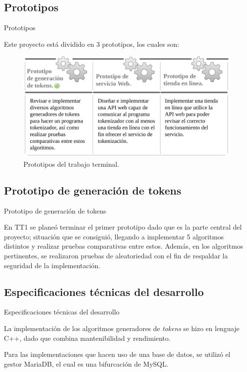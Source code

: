 \subsection{Prototipos} %
\begin{frame}{Prototipos}

  Este proyecto está dividido en 3 prototipos, los cuales son:

  \begin{figure}[H]
    \begin{center}
      \includegraphics[width=1.0\linewidth]{diagramas/prototipos.png}
      \caption{Prototipos del trabajo terminal.}
    \end{center}
  \end{figure}

\end{frame}

\subsection{Prototipo de generación de tokens} %
\begin{frame}{Prototipo de generación de tokens}

  En TT1 se planeó terminar el primer prototipo dado que es la parte
  central del proyecto; situación que se consiguió, llegando a implementar
  5 algoritmos distintos y realizar pruebas comparativas entre estos.
  Además, en los algoritmos pertinentes, se realizaron pruebas de
  aleatoriedad con el fin de respaldar la seguridad de la implementación.

\end{frame}

\subsection{Especificaciones técnicas del desarrollo} %
\begin{frame}{Especificaciones técnicas del desarrollo}


  La implementación de los algoritmos generadores de \textit{tokens} se hizo
  en lenguaje C++, dado que combina mantenibilidad y rendimiento.

  Para las implementaciones que hacen uso de una base de datos, se utilizó
  el gestor MariaDB, el cual es una bifurcación de MySQL.

\end{frame}
